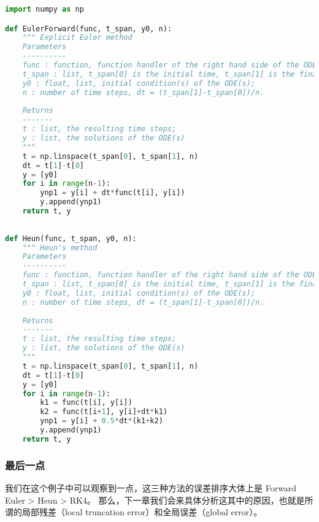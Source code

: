 \begin{lstlisting}[language=python]
import numpy as np

def EulerForward(func, t_span, y0, n):
    """ Explicit Euler method
    Parameters
    ----------
    func : function, function handler of the right hand side of the ODE(s);
    t_span : list, t_span[0] is the initial time, t_span[1] is the final time;
    y0 : float, list, initial condition(s) of the ODE(s);
    n : number of time steps, dt = (t_span[1]-t_span[0])/n.
        
    Returns
    -------
    t : list, the resulting time steps;
    y : list, the solutions of the ODE(s)
    """
    t = np.linspace(t_span[0], t_span[1], n)
    dt = t[1]-t[0]
    y = [y0]
    for i in range(n-1):
        ynp1 = y[i] + dt*func(t[i], y[i])
        y.append(ynp1)
    return t, y
    
    
def Heun(func, t_span, y0, n):
    """ Heun's method
    Parameters
    ----------
    func : function, function handler of the right hand side of the ODE(s);
    t_span : list, t_span[0] is the initial time, t_span[1] is the final time;
    y0 : float, list, initial condition(s) of the ODE(s);
    n : number of time steps, dt = (t_span[1]-t_span[0])/n.
        
    Returns
    -------
    t : list, the resulting time steps;
    y : list, the solutions of the ODE(s)
    """
    t = np.linspace(t_span[0], t_span[1], n)
    dt = t[1]-t[0]
    y = [y0]
    for i in range(n-1):
        k1 = func(t[i], y[i])
        k2 = func(t[i+1], y[i]+dt*k1)
        ynp1 = y[i] + 0.5*dt*(k1+k2)
        y.append(ynp1)
    return t, y
\end{lstlisting}

\subsubsection{最后一点}

我们在这个例子中可以观察到一点，这三种方法的误差排序大体上是 Forward Euler > Heun > RK4。 那么，下一章我们会来具体分析这其中的原因，也就是所谓的局部残差（local truncation error）和全局误差（global error）。
